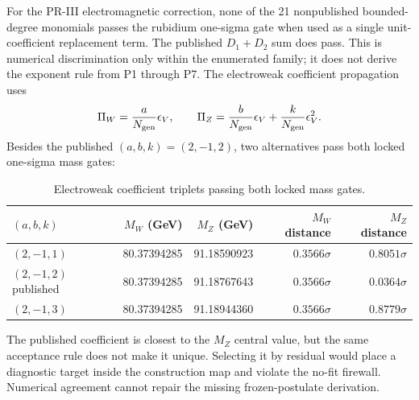 For the PR-III electromagnetic correction, none of the 21 nonpublished
bounded-degree monomials passes the rubidium one-sigma gate when used as a
single unit-coefficient replacement term.  The published $D_1+D_2$ sum does
pass.  This is numerical discrimination only within the enumerated family; it
does not derive the exponent rule from P1 through P7. The electroweak coefficient propagation uses
\begin{equation}
 \Pi_W=\frac{a}{N_{\rm gen}}\epsilon_V,\qquad
 \Pi_Z=\frac{b}{N_{\rm gen}}\epsilon_V+
       \frac{k}{N_{\rm gen}}\epsilon_V^2.
\end{equation}
Besides the published $(a,b,k)=(2,-1,2)$, two alternatives pass both locked
one-sigma mass gates:
\begin{table}[H]
\centering
\small
\caption{Electroweak coefficient triplets passing both locked mass gates.}
\label{tab:ew-alternative-diagnostics}
\begin{tabular}{@{}lrrrr@{}}
\toprule
$(a,b,k)$ & $M_W$ (GeV) & $M_Z$ (GeV) & $M_W$ distance & $M_Z$ distance \\
\midrule
$(2,-1,1)$ & 80.37394285 & 91.18590923 & $0.3566\sigma$ & $0.8051\sigma$ \\
$(2,-1,2)$ published & 80.37394285 & 91.18767643 & $0.3566\sigma$ & $0.0364\sigma$ \\
$(2,-1,3)$ & 80.37394285 & 91.18944360 & $0.3566\sigma$ & $0.8779\sigma$ \\
\bottomrule
\end{tabular}
\end{table}

The published coefficient is closest to the $M_Z$ central value, but the
same acceptance rule does not make it unique.  Selecting it by residual would
place a diagnostic target inside the construction map and violate the no-fit
firewall.  Numerical agreement cannot repair the missing frozen-postulate
derivation.
